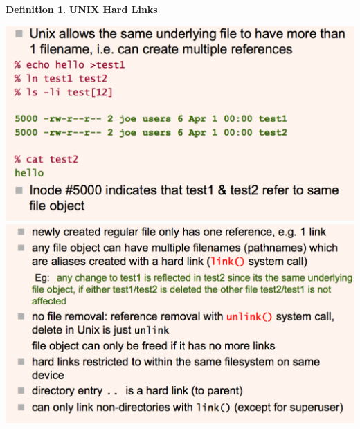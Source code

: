 \documentclass[11pt,a4paper]{article}
\theoremstyle{definition}
\newtheorem{definition}{Definition}[section]
\begin{document}
\begin{definition}{\textbf{UNIX Hard Links}}
	\vspace{3mm}
	
	\hspace{-15mm}
	\includegraphics[scale=0.35]{m2/unixHardLink1}
	\includegraphics[scale=0.35]{m2/unixHardLink2}
	
\end{definition}
\end{document}
